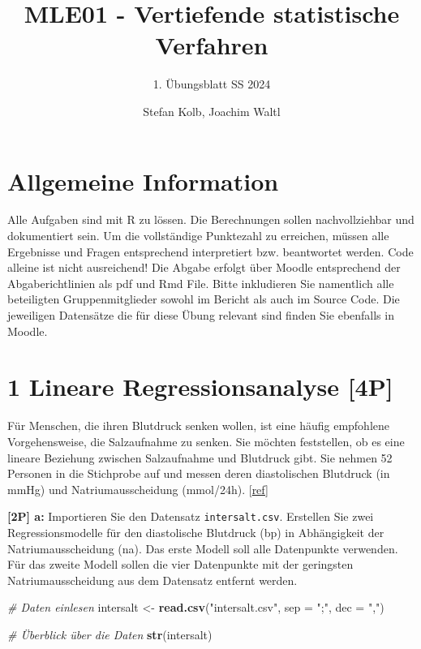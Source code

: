 \documentclass[
]{article}
\title{MLE01 - Vertiefende statistische Verfahren}
\subtitle{1. Übungsblatt SS 2024}
\author{Stefan Kolb, Joachim Waltl}
\date{}
\newenvironment{Shaded}{\begin{snugshade}}{\end{snugshade}}
\newcommand{\AttributeTok}[1]{\textcolor[rgb]{0.13,0.29,0.53}{#1}}
\newcommand{\CommentTok}[1]{\textcolor[rgb]{0.56,0.35,0.01}{\textit{#1}}}
\newcommand{\FunctionTok}[1]{\textcolor[rgb]{0.13,0.29,0.53}{\textbf{#1}}}
\newcommand{\NormalTok}[1]{#1}
\newcommand{\OtherTok}[1]{\textcolor[rgb]{0.56,0.35,0.01}{#1}}
\newcommand{\StringTok}[1]{\textcolor[rgb]{0.31,0.60,0.02}{#1}}
\begin{document}
\maketitle

\hypertarget{allgemeine-information}{%
\section{Allgemeine Information}\label{allgemeine-information}}

Alle Aufgaben sind mit R zu lössen. Die Berechnungen sollen
nachvollziehbar und dokumentiert sein. Um die vollständige Punktezahl zu
erreichen, müssen alle Ergebnisse und Fragen entsprechend interpretiert
bzw. beantwortet werden. Code alleine ist nicht ausreichend! Die Abgabe
erfolgt über Moodle entsprechend der Abgaberichtlinien als pdf und Rmd
File. Bitte inkludieren Sie namentlich alle beteiligten
Gruppenmitglieder sowohl im Bericht als auch im Source Code. Die
jeweiligen Datensätze die für diese Übung relevant sind finden Sie
ebenfalls in Moodle.

\hypertarget{lineare-regressionsanalyse-4p}{%
\section{1 Lineare Regressionsanalyse
{[}4P{]}}\label{lineare-regressionsanalyse-4p}}

Für Menschen, die ihren Blutdruck senken wollen, ist eine häufig
empfohlene Vorgehensweise, die Salzaufnahme zu senken. Sie möchten
feststellen, ob es eine lineare Beziehung zwischen Salzaufnahme und
Blutdruck gibt. Sie nehmen 52 Personen in die Stichprobe auf und messen
deren diastolischen Blutdruck (in mmHg) und Natriumausscheidung
(mmol/24h). {[}\href{https://doi.org/10.1136/bmj.297.6644.319}{ref}{]}

\textbf{{[}2P{]} a:} Importieren Sie den Datensatz
\texttt{intersalt.csv}. Erstellen Sie zwei Regressionsmodelle für den
diastolische Blutdruck (bp) in Abhängigkeit der Natriumausscheidung
(na). Das erste Modell soll alle Datenpunkte verwenden. Für das zweite
Modell sollen die vier Datenpunkte mit der geringsten
Natriumausscheidung aus dem Datensatz entfernt werden.

\begin{Shaded}
\begin{Highlighting}[]
\CommentTok{\# Daten einlesen}
\NormalTok{intersalt }\OtherTok{\textless{}{-}} \FunctionTok{read.csv}\NormalTok{(}\StringTok{"intersalt.csv"}\NormalTok{, }\AttributeTok{sep =} \StringTok{";"}\NormalTok{, }\AttributeTok{dec =} \StringTok{","}\NormalTok{)}

\CommentTok{\# Überblick über die Daten}
\FunctionTok{str}\NormalTok{(intersalt)}
\end{Highlighting}
\end{Shaded}
\end{document}
